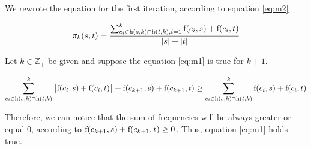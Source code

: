 
We rewrote the equation for the first iteration, according to equation \ref{eq:m2}

\begin{equation} \label{eq:m2}
	\upsigma_{k}(s,t)=\frac
	{\sum_{c_i \in \textnormal{h}(s,k) \cap \textnormal{h}(t,k), i=1}^k \textnormal{f}(c_i,s)+\textnormal{f}(c_i,t)}
	{|s|+|t|}
\end{equation}

Let $k \in \mathbb{Z}_+$ be given and suppose the equation \ref{eq:m1} is true for $k+1$. %



\begin{equation} \label{eq:k3}
	\begin{split}
	\sum_{c_i \in \textnormal{h}(s,k) \cap \textnormal{h}(t,k)}^{k} \begin{bmatrix} \textnormal{f}(c_i,s)+\textnormal{f}(c_i,t)\end{bmatrix} + \textnormal{f}(c_{k+1},s)+\textnormal{f}(c_{k+1},t)
	\geq \sum_{c_i \in \textnormal{h}(s,k) \cap \textnormal{h}(t,k)}^k \textnormal{f}(c_i,s)+\textnormal{f}(c_i,t)
	\end{split}
\end{equation}

Therefore, we can notice that the sum of frequencies will be always greater or equal 0, according to $\textnormal{f}(c_{k+1},s)+\textnormal{f}(c_{k+1},t) \geq 0$. Thus, equation \ref{eq:m1} holds true.


